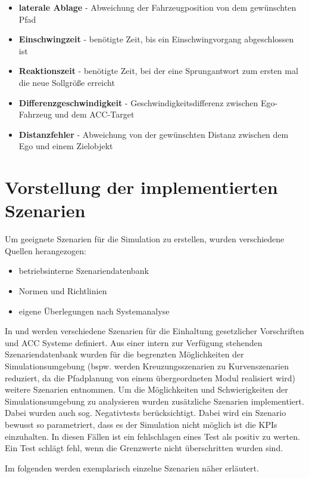 \begin{itemize}
    \item \textbf{laterale Ablage} - Abweichung der Fahrzeugposition von dem gewünschten Pfad
    \item \textbf{Einschwingzeit} - benötigte Zeit, bis ein Einschwingvorgang abgeschlossen ist
    \item \textbf{Reaktionszeit} - benötigte Zeit, bei der eine Sprungantwort zum ersten mal die neue Sollgröße erreicht 
    \item \textbf{Differenzgeschwindigkeit} - Geschwindigkeitsdifferenz zwischen Ego-Fahrzeug und dem ACC-Target
    \item \textbf{Distanzfehler} - Abweichung von der gewünschten Distanz zwischen dem Ego und einem Zielobjekt
\end{itemize}

\section{Vorstellung der implementierten Szenarien} \label{sec:Vorstellung_Szenarien}

Um geeignete Szenarien für die Simulation zu erstellen, wurden verschiedene Quellen herangezogen:
\begin{itemize}
    \item betriebsinterne Szenariendatenbank
    \item Normen und Richtlinien 
    \item eigene Überlegungen nach Systemanalyse
\end{itemize}
In \cite{ISO15622} und \cite{NCAP2024} werden verschiedene Szenarien für die Einhaltung gesetzlicher Vorschriften und ACC Systeme definiert. Aus einer intern zur Verfügung stehenden Szenariendatenbank wurden für die begrenzten Möglichkeiten der Simulationsumgebung (bspw. werden Kreuzungsszenarien zu Kurvenszenarien reduziert, da die Pfadplanung von einem übergeordneten Modul realisiert wird) weitere Szenarien entnommen. Um die Möglichkeiten und Schwierigkeiten der Simulationsumgebung zu analysieren wurden zusätzliche Szenarien implementiert. Dabei wurden auch sog. Negativtests berücksichtigt. Dabei wird ein Szenario bewusst so parametriert, dass es der Simulation nicht möglich ist die KPIs einzuhalten. In diesen Fällen ist ein fehlschlagen eines Test als positiv zu werten. Ein Test schlägt fehl, wenn die Grenzwerte nicht überschritten wurden sind. 

Im folgenden werden exemplarisch einzelne Szenarien näher erläutert. 

